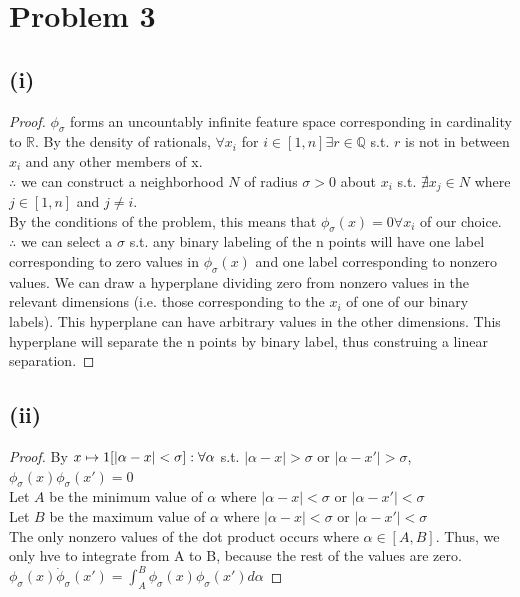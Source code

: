 \documentclass[twoside,11pt]{homework}
\begin{document}
 \section*{Problem 3}
 \subsection*{(i)}
 	\begin{proof}
 		$\phi_\sigma$ forms an uncountably infinite feature space corresponding in cardinality to $\mathbb{R}$.
 		By the density of rationals, $\forall x_i$ for $i \in [1,n] \exists r \in \mathbb{Q}$
 		s.t. $r$ is not in between $x_i$ and any other members of x. \\
 		$\therefore$ we can construct a neighborhood $N$ of radius $\sigma > 0$ about $x_i$
 		s.t. $\nexists x_j \in N$ where $j \in [1, n]$ and $j \neq i$. \\
 		By the conditions of the problem, this means that $\phi_\sigma (x) = 0 \forall x_i$ of our choice. \\
 		$\therefore$ we can select a $\sigma$ s.t. any binary labeling of the n points will have one label corresponding to zero values in $\phi_\sigma(x)$ and one label corresponding to nonzero values. We can draw a hyperplane dividing zero from nonzero values in the relevant dimensions (i.e. those corresponding to the $x_i$ of one of our binary labels). This hyperplane can have arbitrary values in the other dimensions. This hyperplane will separate the n points by binary label, thus construing a linear separation.
 	\end{proof}

 \subsection*{(ii)}
 	\begin{proof}
 		By $x \mapsto 1[|\alpha-x| < \sigma]:\\
 		\forall \alpha$ s.t. $|\alpha - x| > \sigma $ or $|\alpha - x'| > \sigma$, $\phi_\sigma(x) \phi_\sigma(x') = 0$\\
 		Let $A$ be the minimum value of $\alpha$ where $|\alpha - x| < \sigma $ or $|\alpha - x'| < \sigma$\\
 		Let $B$ be the maximum value of $\alpha$ where $|\alpha - x| < \sigma $ or $|\alpha - x'| < \sigma$\\
 		The only nonzero values of the dot product occurs where $\alpha \in [A, B]$.  Thus, we only hve to integrate from A to B, because the rest of the values are zero.\\
 		$\phi_\sigma(x) \dot \phi_\sigma(x') = \int_{A}^{B} \phi_\sigma(x) \phi_\sigma(x') d\alpha$
 	\end{proof}
\end{document}
